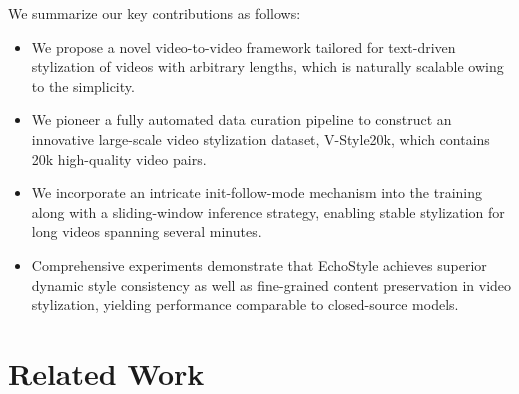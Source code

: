 \documentclass[runningheads]{llncs}
\begin{document}
We summarize our key contributions as follows:
\begin{itemize}
\item We propose a novel video-to-video framework tailored for text-driven stylization of videos with arbitrary lengths, which is naturally scalable owing to the simplicity.
\item We pioneer a fully automated data curation pipeline to construct an innovative large-scale video stylization dataset, V-Style20k, which contains 20k high-quality video pairs.
\item We incorporate an intricate init-follow-mode mechanism into the training along with a sliding-window inference strategy, enabling stable stylization for long videos spanning several minutes.
\item Comprehensive experiments demonstrate that EchoStyle achieves superior dynamic style consistency as well as fine-grained content preservation in video stylization, yielding performance comparable to closed-source models.
\end{itemize}
\section{Related Work}

\end{document}
